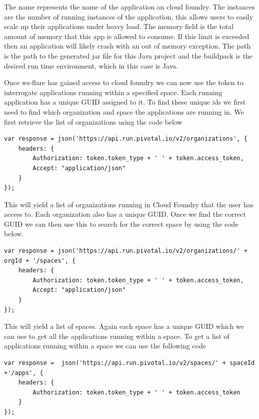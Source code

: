 The name represents the name of the application on cloud foundry. The instances are the number of running instances of the application, this allows users to easily scale up their applications under heavy load. The memory field is the total amount of memory that this app is allowed to consume. If this limit is exceeded then an application will likely crash with an out of memory exception. The path is the path to the generated jar file for this Java project and the buildpack is the desired run time environment, which in this case is Java.

Once ws-flare has gained access to cloud foundry we can now use the token to interrogate applications running within a specified space. Each running application has a unique GUID assigned to it. To find these unique ids we first need to find which organization and space the applications are running in. We first retrieve the list of organizations using the code below

\begin{verbatim}
var response = json('https://api.run.pivotal.io/v2/organizations', {
    headers: {
        Authorization: token.token_type + ' ' + token.access_token,
        Accept: "application/json"
    }
});
\end{verbatim}

This will yield a list of organizations running in Cloud Foundry that the user has access to. Each organization also has a unique GUID. Once we find the correct GUID we can then use this to search for the correct space by using the code below.

\begin{verbatim}
var response = json('https://api.run.pivotal.io/v2/organizations/' + orgId + '/spaces', {
    headers: {
        Authorization: token.token_type + ' ' + token.access_token,
        Accept: "application/json"
    }
});
\end{verbatim}

This will yield a list of spaces. Again each space has a unique GUID which we can use to get all the applications running within a space. To get a list of applications running within a space we can use the following code

\begin{verbatim}
var response =  json('https://api.run.pivotal.io/v2/spaces/' + spaceId +'/apps', {
    headers: {
        Authorization: token.token_type + ' ' + token.access_token
    }
});
\end{verbatim}

